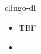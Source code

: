 \begin{frame}{clingo-dl}
  \begin{itemize}
  \item <1-> TBF
  \item {} \cite{jakaosscscwa17a,karoscwa21a}
  \end{itemize}
\end{frame}
%
